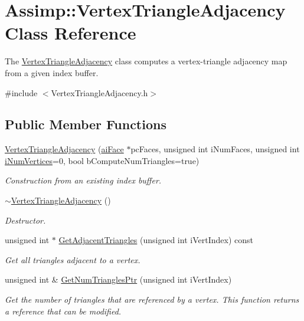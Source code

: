\hypertarget{class_assimp_1_1_vertex_triangle_adjacency}{\section{Assimp\+:\+:Vertex\+Triangle\+Adjacency Class Reference}
\label{class_assimp_1_1_vertex_triangle_adjacency}
}


The \hyperlink{class_assimp_1_1_vertex_triangle_adjacency}{Vertex\+Triangle\+Adjacency} class computes a vertex-\/triangle adjacency map from a given index buffer.  




{\ttfamily \#include $<$Vertex\+Triangle\+Adjacency.\+h$>$}

\subsection*{Public Member Functions}
\begin{DoxyCompactItemize}
\item 
\hyperlink{class_assimp_1_1_vertex_triangle_adjacency_a68ee4678c25fe13b4c4c5c9cd64ebb7b}{Vertex\+Triangle\+Adjacency} (\hyperlink{structai_face}{ai\+Face} $\ast$pc\+Faces, unsigned int i\+Num\+Faces, unsigned int \hyperlink{class_assimp_1_1_vertex_triangle_adjacency_aff248d29bb6a3804ae2ae90272c5625d}{i\+Num\+Vertices}=0, bool b\+Compute\+Num\+Triangles=true)
\begin{DoxyCompactList}\small\item\em Construction from an existing index buffer. \end{DoxyCompactList}\item 
\hypertarget{class_assimp_1_1_vertex_triangle_adjacency_ac0a8e79b69b698a405d6ac11f77d3953}{\hyperlink{class_assimp_1_1_vertex_triangle_adjacency_ac0a8e79b69b698a405d6ac11f77d3953}{$\sim$\+Vertex\+Triangle\+Adjacency} ()}\label{class_assimp_1_1_vertex_triangle_adjacency_ac0a8e79b69b698a405d6ac11f77d3953}

\begin{DoxyCompactList}\small\item\em Destructor. \end{DoxyCompactList}\item 
unsigned int $\ast$ \hyperlink{class_assimp_1_1_vertex_triangle_adjacency_a3be48abc5efab1bc36d96301cc0fbb1f}{Get\+Adjacent\+Triangles} (unsigned int i\+Vert\+Index) const 
\begin{DoxyCompactList}\small\item\em Get all triangles adjacent to a vertex. \end{DoxyCompactList}\item 
unsigned int \& \hyperlink{class_assimp_1_1_vertex_triangle_adjacency_ad56cc55f0959685bf56186796559b608}{Get\+Num\+Triangles\+Ptr} (unsigned int i\+Vert\+Index)
\begin{DoxyCompactList}\small\item\em Get the number of triangles that are referenced by a vertex. This function returns a reference that can be modified. \end{DoxyCompactList}\end{DoxyCompactItemize}
